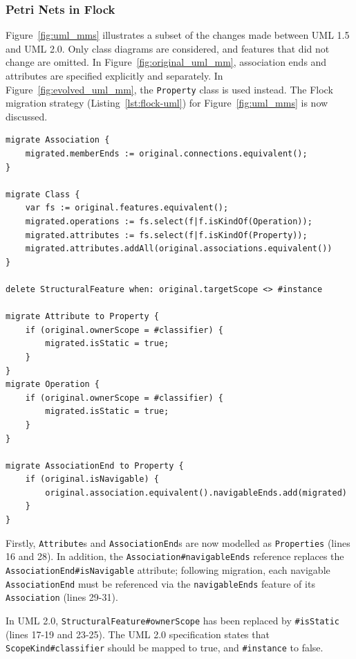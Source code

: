 \subsubsection{Petri Nets in Flock}
Figure~\ref{fig:uml_mms} illustrates a subset of the changes made between UML 1.5 and UML 2.0. Only class diagrams are considered, and features that did not change are omitted. In Figure~\ref{fig:original_uml_mm}, association ends and attributes are specified explicitly and separately. In Figure~\ref{fig:evolved_uml_mm}, the \texttt{Pr\-op\-er\-ty} class is used instead. The Flock migration strategy (Listing~\ref{lst:flock-uml}) for Figure~\ref{fig:uml_mms} is now discussed.

\begin{lstlisting}[caption=UML model migration in Flock, label=lst:flock-uml, language=Flock]
migrate Association {
	migrated.memberEnds := original.connections.equivalent();
}

migrate Class {
	var fs := original.features.equivalent();
	migrated.operations := fs.select(f|f.isKindOf(Operation));
	migrated.attributes := fs.select(f|f.isKindOf(Property));
	migrated.attributes.addAll(original.associations.equivalent())
}

delete StructuralFeature when: original.targetScope <> #instance

migrate Attribute to Property {
	if (original.ownerScope = #classifier) {
		migrated.isStatic = true;		
	}
}
migrate Operation {
	if (original.ownerScope = #classifier) {
		migrated.isStatic = true;
	}
}

migrate AssociationEnd to Property {
	if (original.isNavigable) {
		original.association.equivalent().navigableEnds.add(migrated)
	}
}
\end{lstlisting}

Firstly, \texttt{At\-tr\-ib\-ut\-e}s and \texttt{As\-so\-ci\-at\-i\-onEn\-d}s are now modelled as \texttt{Pr\-o\-pe\-rt\-ies} (lines 16 and 28). In addition, the \texttt{As\-so\-ci\-at\-i\-on\#na\-vi\-ga\-b\-leEn\-ds} reference replaces the \texttt{As\-so\-ci\-at\-i\-onE\-nd\#isN\-av\-ig\-ab\-le} attribute; following migration, each navigable \texttt{As\-so\-ci\-at\-i\-onE\-nd} must be referenced via the \texttt{na\-vi\-ga\-bl\-eEn\-ds} feature of its \texttt{As\-so\-ci\-at\-ion} (lines 29-31).

In UML 2.0, \texttt{St\-ru\-ct\-ur\-alFe\-at\-ur\-e\#o\-wn\-er\-Sc\-op\-e} has been replaced by \texttt{\#i\-sS\-ta\-ti\-c} (lines 17-19 and 23-25). The UML 2.0 specification states that \texttt{Sc\-op\-eKi\-nd\#cl\-as\-si\-fi\-er} should be mapped to true, and \texttt{\#i\-ns\-ta\-nce} to false. 

